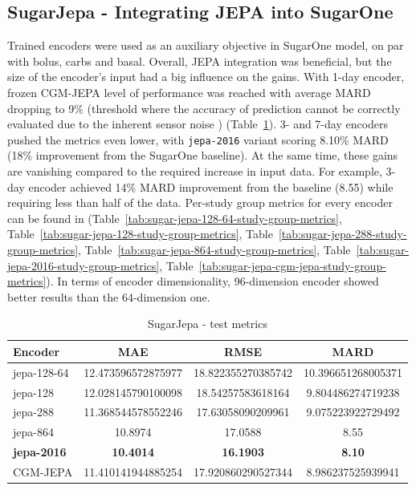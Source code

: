 \documentclass[11pt,a4paper]{article}
\begin{document}
\subsection{SugarJepa - Integrating JEPA into SugarOne}

Trained encoders were used as an auxiliary objective in SugarOne model, on par with bolus, carbs and basal. Overall, JEPA integration was beneficial, but the size of the encoder's input had a big influence on the gains. With 1-day encoder, frozen CGM-JEPA level of performance was reached with average MARD dropping to 9\% (threshold where the accuracy of prediction cannot be correctly evaluated due to the inherent sensor noise \citep{cgm-accuracy}) (Table~\ref{tab:sugar-jepa-test-metrics}). 3- and 7-day encoders pushed the metrics even lower, with \texttt{jepa-2016} variant scoring 8.10\% MARD (18\% improvement from the SugarOne baseline). At the same time, these gains are vanishing compared to the required increase in input data. For example, 3-day encoder achieved 14\% MARD improvement from the baseline (8.55) while requiring less than half of the data.  Per-study group metrics for every encoder can be found in (Table~\ref{tab:sugar-jepa-128-64-study-group-metrics}, Table~\ref{tab:sugar-jepa-128-study-group-metrics}, Table~\ref{tab:sugar-jepa-288-study-group-metrics}, Table~\ref{tab:sugar-jepa-864-study-group-metrics}, Table~\ref{tab:sugar-jepa-2016-study-group-metrics}, Table~\ref{tab:sugar-jepa-cgm-jepa-study-group-metrics}). In terms of encoder dimensionality, 96-dimension encoder showed better results than the 64-dimension one.

\begin{table}[ht]
    \centering
    \begin{tabular}{lccc}
        \hline
        Encoder & MAE & RMSE  & MARD \\
        \hline
        jepa-128-64 & 12.473596572875977 & 18.822355270385742 & 10.396651268005371 \\
        jepa-128 & 12.028145790100098 & 18.54257583618164 & 9.804486274719238 \\
        jepa-288 & 11.368544578552246 & 17.63058090209961 & 9.075223922729492 \\
        jepa-864 & 10.8974 & 17.0588 & 8.55 \\
        \textbf{jepa-2016} & \textbf{10.4014} & \textbf{16.1903} & \textbf{8.10} \\
        CGM-JEPA & 11.410141944885254 & 17.920860290527344 & 8.986237525939941 \\
        \hline
    \end{tabular}
    \caption{SugarJepa - test metrics}
    \label{tab:sugar-jepa-test-metrics}
\end{table}
\end{document}

